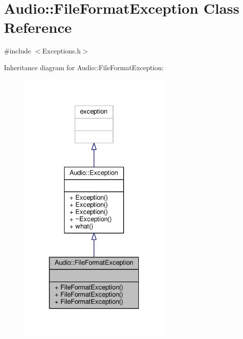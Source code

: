 \hypertarget{classAudio_1_1FileFormatException}{}\section{Audio\+:\+:File\+Format\+Exception Class Reference}
\label{classAudio_1_1FileFormatException}


{\ttfamily \#include $<$Exceptions.\+h$>$}



Inheritance diagram for Audio\+:\+:File\+Format\+Exception\+:
\nopagebreak
\begin{figure}[H]
\begin{center}
\leavevmode
\includegraphics[width=217pt]{d8/d2f/classAudio_1_1FileFormatException__inherit__graph}
\end{center}
\end{figure}


